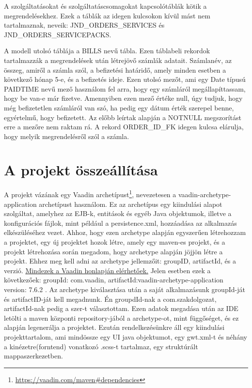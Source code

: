 \documentclass[centeredchapter]{thesis-ekf}
\theoremstyle{definition}
\theoremstyle{remark}
\begin{document}
A szolgáltatásokat és szolgáltatáscsomagokat kapcsolótáblák kötik a megrendelésekhez. Ezek a táblák az idegen kulcsokon kívül mást nem tartalmaznak, neveik: JND\_ORDERS\_SERVICES és JND\_ORDERS\_SERVICEPACKS.

A modell utolsó táblája a BILLS nevű tábla. Ezen táblabeli rekordok tartalmazzák a megrendelések után létrejövő számlák adatait. Számlanév, az összeg, amiről a számla szól, a befizetési határidő, amely minden esetben a következő hónap 5-e, és a befizetés ideje. Ezen utolsó mezőt, ami egy Date típusú PAIDTIME nevű mező használom fel arra, hogy egy számláról megállapíttassam, hogy be van-e már fizetve. Amennyiben ezen mező értéke null, úgy tudjuk, hogy még befizetetlen számláról van szó, ha pedig egy dátum érték szerepel benne, egyértelmű, hogy befizetett. Az előbb leírtak alapján a NOTNULL megszorítást erre a mezőre nem raktam rá. A rekord ORDER\_ID\_FK idegen kulcsa elárulja, hogy melyik megrendelésről szól a számla.


\section{A projekt összeállítása}

A projekt vázának egy Vaadin archetípust\footnote{\url{https://vaadin.com/maven\#dependencies}}, nevezetesen a vaadin-archetype-application archetípust használom. Ez az archetípus egy kiindulási alapot szolgáltat, amelyhez az EJB-k, entitások és egyéb Java objektumok, illetve a konfigurációs fájlok, mint például a persistence.xml, hozzáadása az alkalmazás elkészüléséhez vezet.
Ahhoz, hogy ezen archetype alapján egyszerűen létrehozzam a projektet, egy új projektet hozok létre, amely egy maven-es projekt, és a projekt létrehozása során megadom, hogy archetype alapján jöjjön létre a projekt. Ehhez meg kell adni az archetype jellemzőit: groupID, artifactId, és a verzió. \href{https://vaadin.com/maven#dependencies}{Mindezek a Vaadin honlapján elérhetőek.} Jelen esetben ezek a következőek: groupId: com.vaadin, artifactId:vaadin-archetype-application version: 7.6.2 . Az archetype kiválasztása után a saját alkalmazásunk groupId-ját és artifactID-ját kell megadnunk. Én groupdId-nak a com.szakdolgozat, artifactId-nak pedig a szer-t választottam. Ezen adatok megadása után az IDE letölti a maven központi repository-jából a archetype-ot, mint függőséget, és ez alapján legenerálja a projektet. Ezután rendelkezésünkre áll egy kiindulási projekttartalom, ami mindössze egy UI java objektumot, egy gwt.xml-t és néhány a kinézetre(forntend) vonatkozó .scss-t tartalmaz, egy struktúrált mappaszerkezetben.
\end{document}
